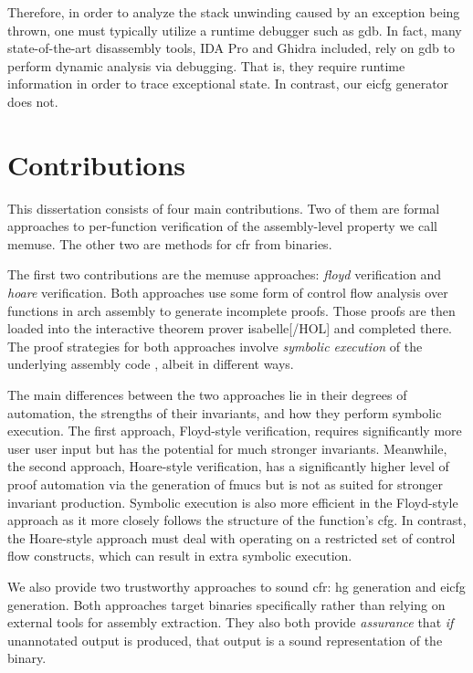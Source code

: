 Therefore, in order to analyze the stack unwinding caused by an exception being thrown, one must typically utilize a runtime debugger such as \gls{gdb}.
In fact, many state-of-the-art disassembly tools, IDA Pro and Ghidra included,
rely on \gls{gdb} to perform dynamic analysis via debugging.
That is, they require runtime information in order to trace exceptional state.
In contrast, our \gls{eicfg} generator does not.

\section{Contributions}
This dissertation consists of four main contributions.
Two of them are formal approaches to per-function verification of the assembly-level property we call \gls{memuse}.
The other two are methods for \gls{cfr} from binaries.

The first two contributions are the \gls{memuse} approaches: \emph{\gls{floyd}} verification and \emph{\gls{hoare}} verification.
Both approaches use some form of control flow analysis over functions in \gls{arch} assembly to generate incomplete proofs.
Those proofs are then loaded into the interactive theorem prover \gls{isabelle}[/HOL] \autocite{nipkow2002isabelle} and completed there.
The proof strategies for both approaches involve \emph{symbolic execution} of the underlying assembly code \autocite{king1976symbolic}, albeit in different ways.

The main differences between the two approaches lie in their degrees of automation, the strengths of their invariants, and how they perform symbolic execution.
The first approach, Floyd-style verification, requires significantly more user user input but has the potential for much stronger invariants.
Meanwhile, the second approach, Hoare-style verification, has a significantly higher level of proof automation via the generation of \glspl{fmuc} but is not as suited for stronger invariant production.
Symbolic execution is also more efficient in the Floyd-style approach as it more closely follows the structure of the function's \gls{cfg}.
In contrast, the Hoare-style approach must deal with operating on a restricted set of control flow constructs, which can result in extra symbolic execution.

We also provide two trustworthy approaches to sound \gls{cfr}: \gls{hg} generation and \gls{eicfg} generation.
Both approaches target binaries specifically rather than relying on external tools for assembly extraction.
They also both provide \emph{assurance} that \emph{if} unannotated output is produced, that output is a sound representation of the binary.

